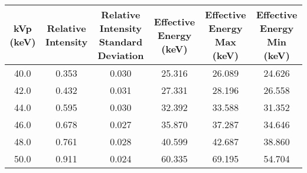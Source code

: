 \begin{tabular}{cccccc}
\toprule
 kVp (keV) &  Relative Intensity &  Relative Intensity Standard Deviation &  Effective Energy (keV) &  Effective Energy Max (keV) &  Effective Energy Min (keV) \\
\midrule
      40.0 &               0.353 &                                  0.030 &                  25.316 &                      26.089 &                      24.626 \\
      42.0 &               0.432 &                                  0.031 &                  27.331 &                      28.196 &                      26.558 \\
      44.0 &               0.595 &                                  0.030 &                  32.392 &                      33.588 &                      31.352 \\
      46.0 &               0.678 &                                  0.027 &                  35.870 &                      37.287 &                      34.646 \\
      48.0 &               0.761 &                                  0.028 &                  40.599 &                      42.687 &                      38.860 \\
      50.0 &               0.911 &                                  0.024 &                  60.335 &                      69.195 &                      54.704 \\
\bottomrule
\end{tabular}
